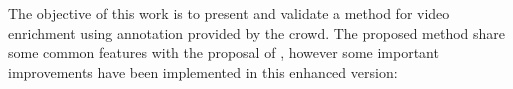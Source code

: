 








The objective of this work is to present and validate a method for video enrichment using annotation provided by the crowd. The proposed method share some common features with the proposal of \cite{172450}, however some important improvements have been implemented in this enhanced version: 


